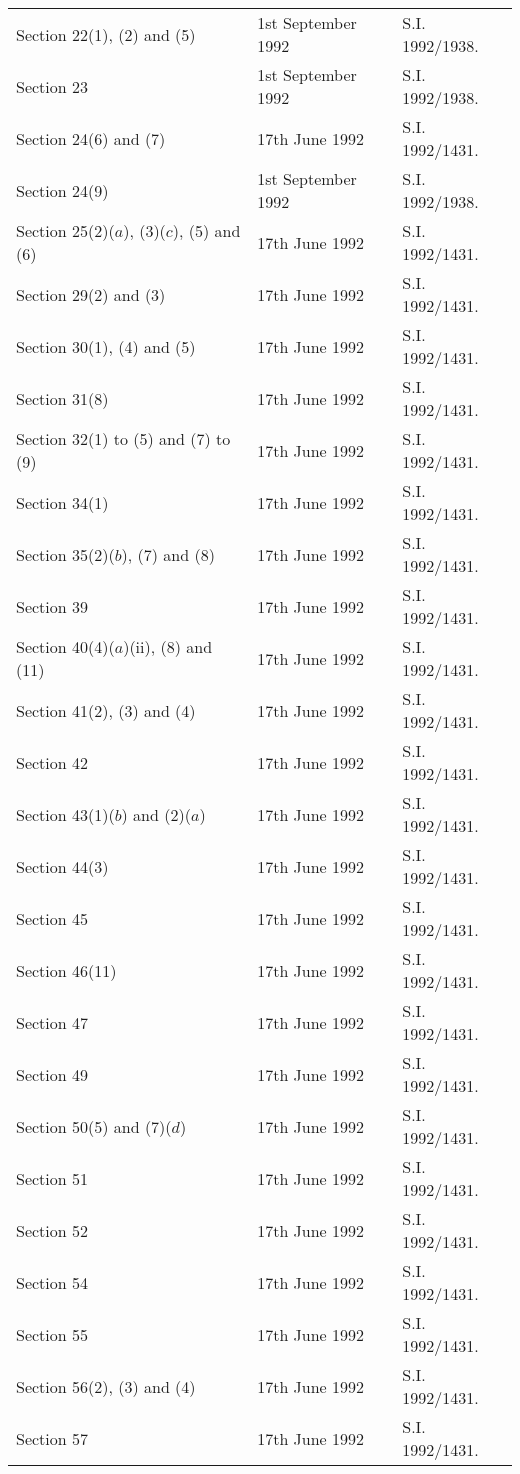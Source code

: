 \documentclass[a4paper]{article}
\begin{document}
\begin{longtable}{p{134pt}p{100pt}p{75pt}}
Section 22(1), (2) and (5)&1st September 1992&S.I. 1992/1938.\\
Section 23&1st September 1992&S.I. 1992/1938.\\
Section 24(6) and (7)&17th June 1992&S.I. 1992/1431.\\
Section 24(9)&1st September 1992&S.I. 1992/1938.\\
Section 25(2)($a$), (3)($c$), (5) and (6)&17th June 1992&S.I. 1992/1431.\\
Section 29(2) and (3)&17th June 1992&S.I. 1992/1431.\\
Section 30(1), (4) and (5)&17th June 1992&S.I. 1992/1431.\\
Section 31(8)&17th June 1992&S.I. 1992/1431.\\
Section 32(1) to (5) and (7) to (9)&17th June 1992&S.I. 1992/1431.\\
Section 34(1)&17th June 1992&S.I. 1992/1431.\\
Section 35(2)($b$), (7) and (8)&17th June 1992&S.I. 1992/1431.\\
Section 39&17th June 1992&S.I. 1992/1431.\\
Section 40(4)($a$)(ii), (8) and (11)&17th June 1992&S.I. 1992/1431.\\
Section 41(2), (3) and (4)&17th June 1992&S.I. 1992/1431.\\
Section 42&17th June 1992&S.I. 1992/1431.\\
Section 43(1)($b$) and (2)($a$)&17th June 1992&S.I. 1992/1431.\\
Section 44(3)&17th June 1992&S.I. 1992/1431.\\
Section 45&17th June 1992&S.I. 1992/1431.\\
Section 46(11)&17th June 1992&S.I. 1992/1431.\\
Section 47&17th June 1992&S.I. 1992/1431.\\
Section 49&17th June 1992&S.I. 1992/1431.\\
Section 50(5) and (7)($d$)&17th June 1992&S.I. 1992/1431.\\
Section 51&17th June 1992&S.I. 1992/1431.\\
Section 52&17th June 1992&S.I. 1992/1431.\\
Section 54&17th June 1992&S.I. 1992/1431.\\
Section 55&17th June 1992&S.I. 1992/1431.\\
Section 56(2), (3) and (4)&17th June 1992&S.I. 1992/1431.\\
Section 57&17th June 1992&S.I. 1992/1431.\\

\end{longtable}
\end{document}
